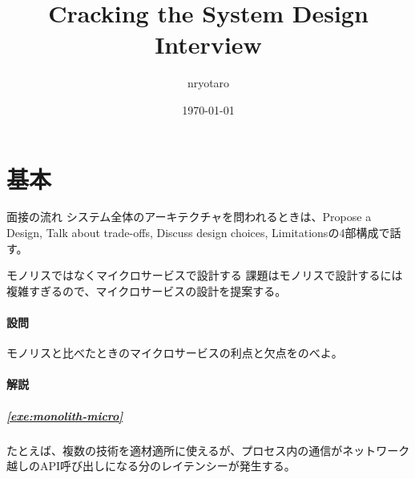 \documentclass{jlreq}
\begin{document}
\title{Cracking the System Design Interview}
\author{nryotaro}
\date{\today}
\maketitle
\tableofcontents
\part{基本}
\begin{section-bib}{面接の流れ}
  システム全体のアーキテクチャを問われるときは、Propose a Design, Talk about trade-offs, Discuss design choices, Limitationsの4部構成で話す\cite{lc-high}。
\end{section-bib}
% 
\begin{section-bib}{モノリスではなくマイクロサービスで設計する}
  課題はモノリスで設計するには複雑すぎるので、マイクロサービスの設計を提案する\cite{lc-aa}。
  \subsection{設問}
  \begin{exercise}
  \item モノリスと比べたときのマイクロサービスの利点と欠点をのべよ。\label{exe:monolith-micro}  
  \end{exercise}
  \subsection{解説}
  \subsubsection*{\ref{exe:monolith-micro}}
  たとえば、複数の技術を適材適所に使えるが、プロセス内の通信がネットワーク越しのAPI呼び出しになる分のレイテンシーが発生する\cite{lc-aa}。  
\end{section-bib}
\end{document}
